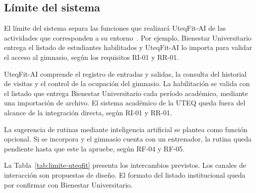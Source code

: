 \subsection{Límite del sistema}

El límite del sistema separa las funciones que realizará UteqFit-AI
de las actividades que corresponden a su entorno~\cite{pohl2025}.
Por ejemplo, Bienestar Universitario entrega el listado de estudiantes
habilitados y UteqFit-AI lo importa para validar el acceso al gimnasio,
según los requisitos RI-01 y RR-01.

UteqFit-AI comprende el registro de entradas y salidas, la consulta
del historial de visitas y el control de la ocupación del gimnasio.
La habilitación se valida con el listado que entrega Bienestar
Universitario cada período académico, mediante una importación de
archivo. El sistema académico de la UTEQ queda fuera del alcance de
la integración directa, según RI-01 y RR-01.

La sugerencia de rutinas mediante inteligencia artificial se plantea
como función opcional. Si se incorpora y el gimnasio cuenta con un
entrenador, la rutina queda pendiente hasta que este la apruebe, según
RF-04 y RF-05.

La Tabla~\ref{tab:limite-uteqfit} presenta los intercambios previstos.
Los canales de interacción son propuestas de diseño. El formato del
listado institucional queda por confirmar con Bienestar Universitario.

